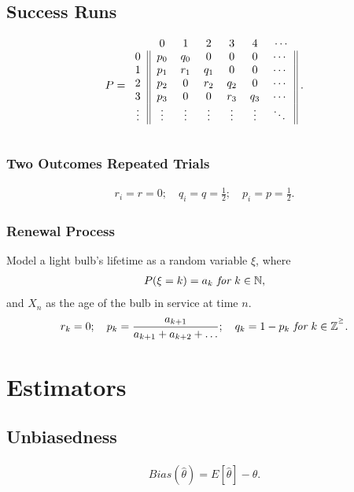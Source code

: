 \documentclass{article}
\begin{document}
\subsection{Success Runs}
\begin{align*}
    P = 
        \begin{blockarray}{ccccccc}
            & 0 & 1 & 2 & 3 & 4 & \cdots \\
            \begin{block}{c||cccccc||}
                0 & p_0 & q_0 & 0 & 0 & 0 & \cdots \\
                1 & p_1 & r_1 & q_1 & 0 & 0 & \cdots \\
                2 & p_2 & 0 & r_2 & q_2 & 0 & \cdots \\
                3 & p_3 & 0 & 0 & r_3 & q_3 & \cdots \\
                \vdots & \vdots & \vdots & \vdots & \vdots & \vdots & \ddots \\
            \end{block} 
        \end{blockarray}\; .
\end{align*}

\subsubsection{Two Outcomes Repeated Trials}
\begin{align*}
    r_i = r = 0; \quad q_i = q = \frac{1}{2}; \quad p_i = p = \frac{1}{2}.
\end{align*}

\subsubsection{Renewal Process} 
Model a light bulb's lifetime as a random variable $\xi$, where
\begin{align*}
    P(\xi=k) = a_k \emph{ for } k \in\mathbb{N},
\end{align*}
and $X_n$ as the age of the bulb in service at time $n$.
\begin{align*}
    r_k = 0; \quad p_k = \frac{a_{k+1}}{a_{k+1} + a_{k+2} + \dots}; \quad q_k = 1-p_k \emph{ for } k \in\mathbb{Z^{^\ge}}.
\end{align*}

\newpage
\section{Estimators}
\subsection{Unbiasedness}
\begin{align*}
    Bias(\hat{\theta}) = E[\hat{\theta}] - \theta.
\end{align*}
\end{document}
